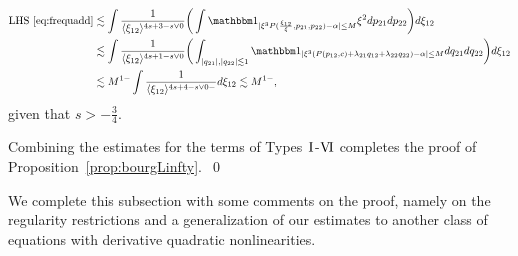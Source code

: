 \documentclass[%
11pt,  reqno]{amsart}
\newcommand{\I}{\hspace{0.2mm}\textup{I}\hspace{0.2mm}}
\newcommand{\5}{\textup{V}}
\newcommand{\VI}{\text{V\hspace{-1.6mm} I}}
\newcommand{\ind}{\mathbbm 1}
\newcommand{\les}{\lesssim}
\newcommand{\wt}{\widetilde}
\theoremstyle{remark}
\newcommand{\TT}{\mathcal{T}}
\newcommand{\al}{\alpha}
\newcommand{\G}{\Gamma}
\newcommand{\ld}{\lambda}
\newcommand{\jb}[1]
{\langle #1 \rangle}
\numberwithin{equation}{section}
\numberwithin{theorem}{section}
\begin{document}
\begin{align}
\text{LHS } \eqref{eq:frequadd}
&
\les 
\int \frac{ 1 }{ \jb{\xi_{12}}^{4s+3 - s \lor 0} } 
\bigg( 
\int \ind_{|\xi^3 P(\frac{\xi_{12}}{\xi}, p_{21}, p_{22}) - \al| \le M} \xi^2 dp_{21} dp_{22} 
\bigg)
d\xi_{12}
\\
&
\les 
\int \frac{1}{\jb{\xi_{12}}^{4s+1 - s \lor 0}} 
\bigg( 
\int_{|q_{21}| ,  |q_{22}| \les 1} 
\ind_{|\xi^3 (P(p_{12},c) + \ld_{21} q_{12} + \ld_{22} q_{22}) - \al| \le M } 
d q_{21} dq_{22}
\bigg) 
d\xi_{12}
\\
&
\les M^{1-} \int \frac{1}{\jb{\xi_{12}}^{4s+4-s\lor 0 -}} d \xi_{12}
\les M^{1-},
\end{align}
given that $s> -\frac34$.






Combining the estimates for the terms of Types $\I$-$\VI$ completes the proof of Proposition~\ref{prop:bourgLinfty}.~\qed

\bigskip 

We complete this subsection with some comments on the proof, namely on the regularity restrictions and a generalization of our estimates to another class of equations with derivative quadratic nonlinearities. 
\end{document}
